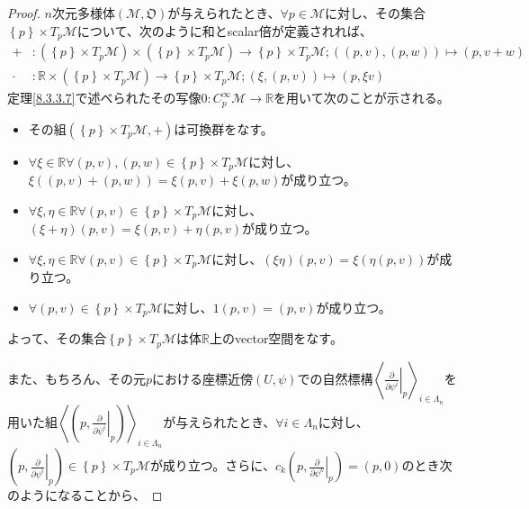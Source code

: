 \documentclass[dvipdfmx]{jsarticle}
\begin{document}
\begin{proof}
  $n$次元多様体$\left(\mathcal{M},\mathfrak{O}\right)$が与えられたとき、$\forall p\in \mathcal{M}$に対し、その集合$\left\{ p\right\} \times T_p \mathcal{M}$について、次のように和とscalar倍が定義されれば、
  \begin{align*}
    +&:\left( \left\{ p\right\} \times T_p \mathcal{M} \right) \times \left( \left\{ p\right\} \times T_p \mathcal{M} \right) \rightarrow \left\{ p\right\} \times T_p \mathcal{M} ;\left(\left(p,v\right),\left(p,w\right) \right) \mapsto \left(p,v+w\right)\\
    \cdot &: \mathbb{R} \times \left( \left\{ p\right\} \times T_p \mathcal{M} \right) \rightarrow \left\{ p\right\} \times T_p \mathcal{M}; \left(\xi ,\left(p,v\right)\right) \mapsto \left(p,\xi v\right)
  \end{align*}
  定理\ref{8.3.3.7}で述べられたその写像$0:C^\infty_p \mathcal{M} \rightarrow \mathbb{R}$を用いて次のことが示される。
  \begin{itemize}
    \item その組$\left(\left\{ p\right\} \times T_p \mathcal{M} ,+\right)$は可換群をなす。
    \item $\forall \xi \in \mathbb{R} \forall \left(p,v\right) ,\left(p,w\right) \in \left\{ p\right\} \times T_p \mathcal{M}$に対し、$\xi \left(\left(p,v\right)+\left(p,w\right)\right)=\xi \left(p,v\right)+\xi \left(p,w\right)$が成り立つ。
    \item $\forall \xi ,\eta \in \mathbb{R} \forall \left(p,v\right)\in \left\{ p\right\} \times T_p \mathcal{M}$に対し、$\left(\xi +\eta\right)\left(p,v\right)=\xi \left(p,v\right)+\eta \left(p,v\right)$が成り立つ。
    \item $\forall \xi ,\eta \in \mathbb{R} \forall \left(p,v\right)\in \left\{ p\right\} \times T_p \mathcal{M}$に対し、$\left(\xi \eta\right)\left(p,v\right)=\xi \left( \eta \left(p,v\right)\right) $が成り立つ。
    \item $\forall \left(p,v\right)\in \left\{ p\right\} \times T_p \mathcal{M}$に対し、$1\left(p,v\right)=\left(p,v\right)$が成り立つ。
  \end{itemize}
  よって、その集合$\left\{ p\right\} \times T_p \mathcal{M}$は体$\mathbb{R}$上のvector空間をなす。\par
  また、もちろん、その元$p$における座標近傍$\left(U,\psi\right)$での自然標構$\left\langle \left. \frac{\partial}{\partial \psi^i }\right|_p \right\rangle_{i\in \varLambda_n } $を用いた組$\left\langle \left(p,\left.\frac{\partial }{\partial \psi^i } \right|_p \right)\right\rangle_{i\in \varLambda_n }$が与えられたとき、$\forall i\in \varLambda_n $に対し、$\left(p,\left.\frac{\partial }{\partial \psi^i } \right|_p \right) \in \left\{ p\right\} \times T_p \mathcal{M}$が成り立つ。さらに、$c_k \left(p,\left.\frac{\partial }{\partial \psi^k } \right|_p \right) =\left(p,0\right) $のとき次のようになることから、

\end{proof}
\end{document}
